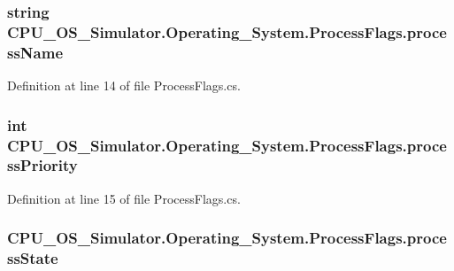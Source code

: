 \subsubsection[{process\+Name}]{\setlength{\rightskip}{0pt plus 5cm}string C\+P\+U\+\_\+\+O\+S\+\_\+\+Simulator.\+Operating\+\_\+\+System.\+Process\+Flags.\+process\+Name}\label{struct_c_p_u___o_s___simulator_1_1_operating___system_1_1_process_flags_a2823e57851d2940c47cd06afd0487360}


Definition at line 14 of file Process\+Flags.\+cs.

\hypertarget{struct_c_p_u___o_s___simulator_1_1_operating___system_1_1_process_flags_a0a14c1f617bd3cd4d2b28b5f13cf83d5}{}
\subsubsection[{process\+Priority}]{\setlength{\rightskip}{0pt plus 5cm}int C\+P\+U\+\_\+\+O\+S\+\_\+\+Simulator.\+Operating\+\_\+\+System.\+Process\+Flags.\+process\+Priority}\label{struct_c_p_u___o_s___simulator_1_1_operating___system_1_1_process_flags_a0a14c1f617bd3cd4d2b28b5f13cf83d5}


Definition at line 15 of file Process\+Flags.\+cs.

\hypertarget{struct_c_p_u___o_s___simulator_1_1_operating___system_1_1_process_flags_ac5d7a47d263eb80357b0a7900858bd98}{}
\subsubsection[{process\+State}]{ C\+P\+U\+\_\+\+O\+S\+\_\+\+Simulator.\+Operating\+\_\+\+System.\+Process\+Flags.\+process\+State}\label{struct_c_p_u___o_s___simulator_1_1_operating___system_1_1_process_flags_ac5d7a47d263eb80357b0a7900858bd98}


